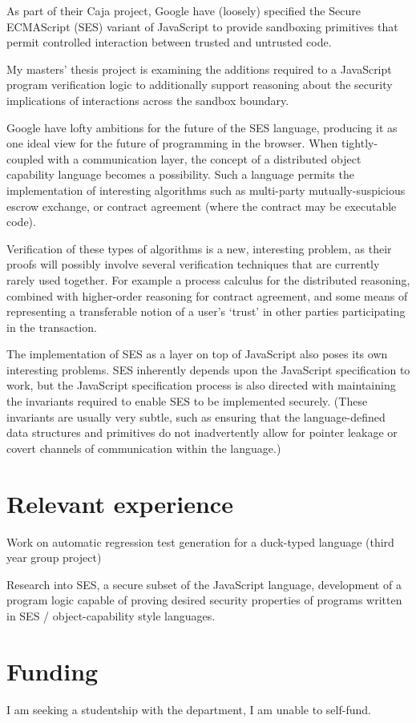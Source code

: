 \documentclass[a4paper]{article}
\begin{document}
As part of their Caja project, Google have (loosely) specified the Secure
ECMAScript (SES) variant of JavaScript to provide sandboxing primitives that
permit controlled interaction between trusted and untrusted code.

My masters' thesis project is examining the additions required to a JavaScript
program verification logic to additionally support reasoning about the security
implications of interactions across the sandbox boundary.

Google have lofty ambitions for the future of the SES language, producing it as
one ideal view for the future of programming in the browser. When
tightly-coupled with a communication layer, the concept of a distributed object
capability language becomes a possibility. Such a language permits the
implementation of interesting algorithms such as multi-party mutually-suspicious
escrow exchange, or contract agreement (where the contract may be executable
code).

Verification of these types of algorithms is a new, interesting problem, as
their proofs will possibly involve several verification techniques that are
currently rarely used together. For example a process calculus for the
distributed reasoning, combined with higher-order reasoning for contract
agreement, and some means of representing a transferable notion of a user's
`trust' in other parties participating in the transaction.

The implementation of SES as a layer on top of JavaScript also poses its own
interesting problems. SES inherently depends upon the JavaScript specification
to work, but the JavaScript specification process is also directed with
maintaining the invariants required to enable SES to be implemented securely.
(These invariants are usually very subtle, such as ensuring that the
language-defined data structures and primitives do not inadvertently allow for
pointer leakage or covert channels of communication within the language.)

\section{Relevant experience}
Work on automatic regression test generation for a duck-typed language (third
year group project)

Research into SES, a secure subset of the JavaScript language, development of
  a program logic capable of proving desired security properties of programs
  written in SES / object-capability style languages.

\section{Funding}
I am seeking a studentship with the department, I am unable to self-fund.
\end{document}
